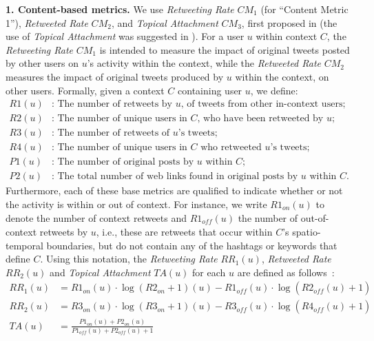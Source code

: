 \documentclass[runningheads]{llncs}
\begin{document}
\noindent \textbf{1. Content-based metrics.} We use  \textit{Retweeting Rate} $\mathit{CM}_1$ (for ``Content Metric 1''), \textit{Retweeted Rate} $\mathit{CM}_2$, and  \textit{Topical Attachment}  $\mathit{CM}_3$, first proposed in \cite{Bizid:2015} (the use of \textit{Topical Attachment} was suggested in \cite{Poell2014}).
%
For a user $u$ within context $C$, the \textit{Retweeting Rate}  $\mathit{CM}_1$ is intended to measure the impact of  original tweets posted  by other users on $u$'s activity within the context, while the \textit{Retweeted Rate} $\mathit{CM}_2$  measures the impact of original tweets produced by $u$ within the context, on other users.
Formally, given a context $C$ containing user $u$, we define:
%
\begin{align*}
\mathit{R1}(u) &\text{: The number of retweets by $u$, of tweets from other in-context users;}\\
\mathit{R2}(u)&\text{: The number of unique users in $C$, who have been retweeted by $u$;}\\
\mathit{R3}(u)&\text{: The number of retweets of $u$'s  tweets;}\\
\mathit{R4}(u)&\text{: The number of unique users in $C$ who retweeted $u$'s tweets;}\\
\mathit{P1}(u)&\text{: The number of original posts by $u$ within $C$;}\\
\mathit{P2}(u)&\text{: The total number of web links found in original posts by $u$ within $C$.}
\end{align*}
%
Furthermore, each of these base metrics  are qualified to indicate whether or not the activity is within or out of context.
For instance, we write $R1_{on}(u)$ to denote the number of context retweets and $R1_{\mathit{off}}(u)$ the number of out-of-context retweets by $u$, i.e., these are retweets that occur within $C$'s spatio-temporal boundaries, but do not contain any of the hashtags or keywords that define $C$.  
Using this notation, the \textit{Retweeting Rate} $\mathit{RR}_1(u)$, \textit{Retweeted Rate} $\mathit{RR}_2(u)$ and \textit{Topical Attachment} $TA(u)$ for each $u$ are defined as follows~\cite{Bizid:2015}:
\begin{align*}
\mathit{RR}_1(u) & =  \mathit{R1}_{on}(u) \cdot \log(\mathit{R2}_{on}+1)(u) - \mathit{R1}_{\mathit{off}}(u) \cdot \log(\mathit{R2}_{\mathit{off}}(u)+1) \\
\mathit{RR}_2(u) & =  \mathit{R3}_{on}(u) \cdot \log(\mathit{R3}_{on}+1)(u) - \mathit{R3}_{\mathit{off}}(u) \cdot \log(\mathit{R4}_{\mathit{off}}(u)+1) \\
\mathit{TA}(u) & = \frac{\mathit{P1}_{on}(u) + \mathit{P2}_{on}(u)}{\mathit{P1}_{\mathit{off}}(u) + \mathit{P2}_{\mathit{off}}(u) +1} 
\end{align*}
\end{document}
